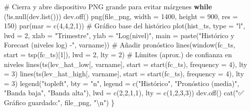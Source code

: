 \documentclass[
  spanish,
  letterpaper,
  DIV=11,
  numbers=noendperiod]{scrartcl}
\newenvironment{Shaded}{\begin{snugshade}}{\end{snugshade}}
\newcommand{\AttributeTok}[1]{\textcolor[rgb]{0.40,0.45,0.13}{#1}}
\newcommand{\CommentTok}[1]{\textcolor[rgb]{0.37,0.37,0.37}{#1}}
\newcommand{\ControlFlowTok}[1]{\textcolor[rgb]{0.00,0.23,0.31}{\textbf{#1}}}
\newcommand{\DecValTok}[1]{\textcolor[rgb]{0.68,0.00,0.00}{#1}}
\newcommand{\FunctionTok}[1]{\textcolor[rgb]{0.28,0.35,0.67}{#1}}
\newcommand{\NormalTok}[1]{\textcolor[rgb]{0.00,0.23,0.31}{#1}}
\newcommand{\SpecialCharTok}[1]{\textcolor[rgb]{0.37,0.37,0.37}{#1}}
\newcommand{\StringTok}[1]{\textcolor[rgb]{0.13,0.47,0.30}{#1}}
\begin{document}
\begin{Shaded}
\begin{Highlighting}[]
  \CommentTok{\# Cierra y abre dispositivo PNG grande para evitar márgenes}
  \ControlFlowTok{while}\NormalTok{ (}\SpecialCharTok{!}\FunctionTok{is.null}\NormalTok{(}\FunctionTok{dev.list}\NormalTok{())) }\FunctionTok{dev.off}\NormalTok{()}
  \FunctionTok{png}\NormalTok{(file\_png, }\AttributeTok{width =} \DecValTok{1400}\NormalTok{, }\AttributeTok{height =} \DecValTok{900}\NormalTok{, }\AttributeTok{res =} \DecValTok{150}\NormalTok{)}
  \FunctionTok{par}\NormalTok{(}\AttributeTok{mar =} \FunctionTok{c}\NormalTok{(}\DecValTok{4}\NormalTok{,}\DecValTok{4}\NormalTok{,}\DecValTok{2}\NormalTok{,}\DecValTok{1}\NormalTok{))}
  \CommentTok{\# Gráfico base del histórico}
  \FunctionTok{plot}\NormalTok{(hist\_ts, }\AttributeTok{type =} \StringTok{"l"}\NormalTok{, }\AttributeTok{lwd =} \DecValTok{2}\NormalTok{, }\AttributeTok{xlab =} \StringTok{"Trimestre"}\NormalTok{, }\AttributeTok{ylab =} \StringTok{"Log(nivel)"}\NormalTok{,}
       \AttributeTok{main =} \FunctionTok{paste}\NormalTok{(}\StringTok{"Histórico y Forecast (niveles log) {-}"}\NormalTok{, varname))}
  \CommentTok{\# Añadir pronóstico}
  \FunctionTok{lines}\NormalTok{(}\FunctionTok{window}\NormalTok{(fc\_ts, }\AttributeTok{start =} \FunctionTok{tsp}\NormalTok{(fc\_ts)[}\DecValTok{1}\NormalTok{]), }\AttributeTok{lwd =} \DecValTok{2}\NormalTok{, }\AttributeTok{lty =} \DecValTok{2}\NormalTok{)}
  \CommentTok{\# Límites (aprox.) de confianza en niveles}
  \FunctionTok{lines}\NormalTok{(}\FunctionTok{ts}\NormalTok{(lev\_hat\_low[, varname],}
           \AttributeTok{start =} \FunctionTok{start}\NormalTok{(fc\_ts), }\AttributeTok{frequency =} \DecValTok{4}\NormalTok{), }\AttributeTok{lty =} \DecValTok{3}\NormalTok{)}
  \FunctionTok{lines}\NormalTok{(}\FunctionTok{ts}\NormalTok{(lev\_hat\_high[, varname],}
           \AttributeTok{start =} \FunctionTok{start}\NormalTok{(fc\_ts), }\AttributeTok{frequency =} \DecValTok{4}\NormalTok{), }\AttributeTok{lty =} \DecValTok{3}\NormalTok{)}
  \FunctionTok{legend}\NormalTok{(}\StringTok{"topleft"}\NormalTok{, }\AttributeTok{bty =} \StringTok{"n"}\NormalTok{,}
         \AttributeTok{legend =} \FunctionTok{c}\NormalTok{(}\StringTok{"Histórico"}\NormalTok{, }\StringTok{"Pronóstico (media)"}\NormalTok{, }\StringTok{"Banda baja"}\NormalTok{, }\StringTok{"Banda alta"}\NormalTok{),}
         \AttributeTok{lwd =} \FunctionTok{c}\NormalTok{(}\DecValTok{2}\NormalTok{,}\DecValTok{2}\NormalTok{,}\DecValTok{1}\NormalTok{,}\DecValTok{1}\NormalTok{), }\AttributeTok{lty =} \FunctionTok{c}\NormalTok{(}\DecValTok{1}\NormalTok{,}\DecValTok{2}\NormalTok{,}\DecValTok{3}\NormalTok{,}\DecValTok{3}\NormalTok{))}
  \FunctionTok{dev.off}\NormalTok{()}
  \FunctionTok{cat}\NormalTok{(}\StringTok{"✅ Gráfico guardado:"}\NormalTok{, file\_png, }\StringTok{"}\SpecialCharTok{\textbackslash{}n}\StringTok{"}\NormalTok{)}
\NormalTok{\}}


\end{Highlighting}
\end{Shaded}
\end{document}
